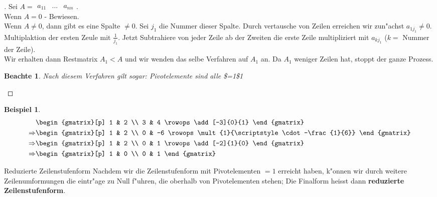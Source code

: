 \documentclass[11pt]{article}
\newtheorem{exa}{Beispiel}[section]
\newtheorem*{notte}{Beachte}
\begin{document}
\begin{proof}[] \label{}
Sei \(A=\begin{matrix}a_{11}&...&a_{nn}\end{matrix}\). \\
Wenn \(A=0\) - Bewiesen. \\
Wenn \(A\not=0\), dann gibt es eine Spalte \(\not= 0\). Sei
\(j_1\) die Nummer dieser Spalte. Durch vertausche von Zeilen erreichen wir
zun"achst \(a_{1j_1}\not= 0\). Multiplaktion der ersten Zeule mit
\(\frac{1}{j_1}\). Jetzt Subtrahiere von jeder Zeile ab der Zweiten die erste
Zeile multipliziert mit \(a_{kj_1}\) (\(k=\) Nummer der Zeile). \\

Wir erhalten dann Restmatrix \(A_1<A\) und wir wenden das selbe Verfahren auf
\(A_1\) an. Da \(A_1\) weniger Zeilen hat, stoppt der ganze Prozess.

\begin{notte}
Nach diesem Verfahren gilt sogar: Pivotelemente sind alle \$=1\$1
\end{notte}
\end{proof}


\begin{exa}
\begin{align*}
  & \begin{gmatrix}[p]
      1 & 2 \\
      3 & 4
      \rowops
      \add[-3]{0}{1}
    \end{gmatrix} \\
  \Rightarrow & \begin{gmatrix}[p]
      1 & 2 \\
      0 & -6
      \rowops
      \mult{1}{\scriptstyle\cdot-\frac{1}{6}}
    \end{gmatrix} \\
  \Rightarrow & \begin{gmatrix}[p]
      1 & 2 \\
      0 & 1
      \rowops
      \add[-2]{1}{0}
    \end{gmatrix} \\
  \Rightarrow & \begin{gmatrix}[p]
      1 & 0 \\
      0 & 1
    \end{gmatrix}
\end{align*}
\end{exa}

\begin{definition}{Reduzierte Zeilenstufenform}{}
Nachdem wir die Zeilenstufenform mit Pivotelementen \(=1\) erreicht haben, k"onnen
wir durch weitere Zeilenumformungen die eintr"age zu Null f"uhren, die oberhalb
von Pivotelementen stehen; Die Finalform heisst dann \textbf{reduzierte
Zeilenstufenform}.
\end{definition}
\end{document}
